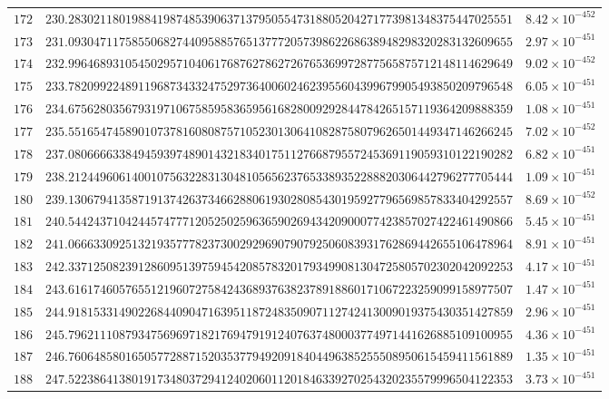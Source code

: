 \documentclass[12pt,reqno]{amsart}
\theoremstyle{remark}
\begin{document}
\begin{longtable}{clc}
$172$ & $230.2830211801988419874853906371379505547318805204271773981348375447025551$ & $8.42\times 10^{-452}$ \\
$173$ & $231.0930471175855068274409588576513777205739862268638948298320283132609655$ & $2.97\times 10^{-451}$ \\
$174$ & $232.9964689310545029571040617687627862726765369972877565875712148114629649$ & $9.02\times 10^{-452}$ \\
$175$ & $233.7820992248911968734332475297364006024623955604399679905493850209796548$ & $6.05\times 10^{-451}$ \\
$176$ & $234.6756280356793197106758595836595616828009292844784265157119364209888359$ & $1.08\times 10^{-451}$ \\
$177$ & $235.5516547458901073781608087571052301306410828758079626501449347146266245$ & $7.02\times 10^{-452}$ \\
$178$ & $237.0806666338494593974890143218340175112766879557245369119059310122190282$ & $6.82\times 10^{-451}$ \\
$179$ & $238.2124496061400107563228313048105656237653389352288820306442796277705444$ & $1.09\times 10^{-451}$ \\
$180$ & $239.1306794135871913742637346628806193028085430195927796569857833404292557$ & $8.69\times 10^{-452}$ \\
$181$ & $240.5442437104244574777120525025963659026943420900077423857027422461490866$ & $5.45\times 10^{-451}$ \\
$182$ & $241.0666330925132193577782373002929690790792506083931762869442655106478964$ & $8.91\times 10^{-451}$ \\
$183$ & $242.3371250823912860951397594542085783201793499081304725805702302042092253$ & $4.17\times 10^{-451}$ \\
$184$ & $243.6161746057655121960727584243689376382378918860171067223259099158977507$ & $1.47\times 10^{-451}$ \\
$185$ & $244.9181533149022684409047163951187248350907112742413009019375430351427859$ & $2.96\times 10^{-451}$ \\
$186$ & $245.7962111087934756969718217694791912407637480003774971441626885109100955$ & $4.36\times 10^{-451}$ \\
$187$ & $246.7606485801650577288715203537794920918404496385255508950615459411561889$ & $1.35\times 10^{-451}$ \\
$188$ & $247.5223864138019173480372941240206011201846339270254320235579996504122353$ & $3.73\times 10^{-451}$ \\

\end{longtable}
\end{document}

